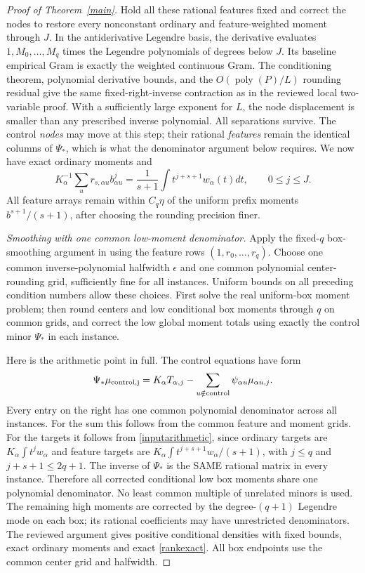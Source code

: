 \documentclass[11pt]{article}
\begin{document}
\begin{proof}[Proof of Theorem~\ref{main}]
Hold all these rational features fixed and correct the nodes to
restore every nonconstant ordinary and feature-weighted moment through
$J$. In the antiderivative Legendre basis, the derivative evaluates
$1,M_0,\ldots,M_q$ times the Legendre polynomials of degrees below $J$.
Its baseline empirical Gram is exactly the weighted continuous Gram.
The conditioning theorem, polynomial derivative bounds, and the
$O(\operatorname{poly}(P)/L)$ rounding residual give the same
fixed-right-inverse contraction as in the reviewed local two-variable
proof. With a sufficiently large exponent for $L$, the node displacement
is smaller than any prescribed inverse polynomial. All separations
survive. The control \emph{nodes} may move at this step; their rational
\emph{features} remain the identical columns of $\Psi_*$, which is
what the denominator argument below requires.
We now have exact ordinary moments and
\begin{equation}\label{rankexact}
 K_\alpha^{-1}\sum_u r_{s,\alpha u}b_{\alpha u}^j
 =\frac1{s+1}\int t^{j+s+1}w_\alpha(t)dt,
       \qquad 0\le j\le J.
\end{equation}
All feature arrays remain within $C_q\eta$ of the uniform prefix
moments $b^{s+1}/(s+1)$, after choosing the rounding precision finer.

\emph{Smoothing with one common low-moment denominator.}
Apply the fixed-$q$ box-smoothing argument in
using the feature rows $(1,r_0,\ldots,r_q)$.
Choose one common inverse-polynomial halfwidth $\epsilon$ and one
common polynomial center-rounding grid, sufficiently fine for all
instances. Uniform bounds on all preceding condition numbers allow
these choices. First solve the real uniform-box moment problem;
then round centers and low conditional box moments through $q$ on
common grids, and correct the low global moment totals using exactly
the control minor $\Psi_*$ in each instance.

Here is the arithmetic point in full. The control equations have form
\[
 \Psi_*\mu_{\rm control,j}
 =K_\alpha T_{\alpha,j}
       -\sum_{u\notin\mathrm{control}}\psi_{\alpha u}\mu_{\alpha u,j}.
\]
Every entry on the right has one common polynomial denominator across
all instances. For the sum this follows from the common feature and
moment grids. For the targets it follows from
\eqref{inputarithmetic}, since ordinary targets are
$K_\alpha\int t^j w_\alpha$ and feature targets are
$K_\alpha\int t^{j+s+1}w_\alpha/(s+1)$, with $j\le q$ and
$j+s+1\le2q+1$.
The inverse of $\Psi_*$ is the SAME rational matrix in every instance.
Therefore all corrected conditional low box moments share one
polynomial denominator. No least common multiple of unrelated minors
is used. The remaining high moments are corrected by the degree-$(q+1)$
Legendre mode on each box; its rational coefficients may have unrestricted
denominators. The reviewed argument gives positive conditional densities
with fixed bounds, exact ordinary moments and exact \eqref{rankexact}.
All box endpoints use the common center grid and halfwidth.


\end{proof}
\end{document}
